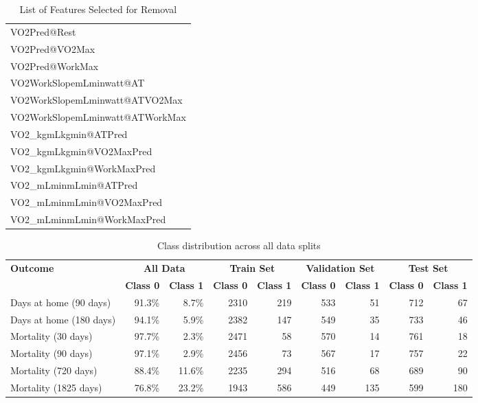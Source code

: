 \documentclass{article}
\begin{document}
\begin{table}[ht]
\begin{tabular}{|l|}
    VO2Pred@Rest \\
    VO2Pred@VO2Max \\
    VO2Pred@WorkMax \\
    VO2WorkSlopemLminwatt@AT \\
    VO2WorkSlopemLminwatt@ATVO2Max \\
    VO2WorkSlopemLminwatt@ATWorkMax \\
    VO2\_kgmLkgmin@ATPred \\
    VO2\_kgmLkgmin@VO2MaxPred \\
    VO2\_kgmLkgmin@WorkMaxPred \\
    VO2\_mLminmLmin@ATPred \\
    VO2\_mLminmLmin@VO2MaxPred \\
    VO2\_mLminmLmin@WorkMaxPred \\
    \hline
    \end{tabular}
    \caption{List of Features Selected for Removal}
    \label{tab:features-to-remove}
\end{table}

\begin{table}[H]
    \centering
    \begin{tabular}{l|rr|rr|rr|rr}
    \toprule
    \multirow{2}{*}{\textbf{Outcome}} & \multicolumn{2}{c|}{\textbf{All Data}} & \multicolumn{2}{c|}{\textbf{Train Set}} & \multicolumn{2}{c|}{\textbf{Validation Set}} & \multicolumn{2}{c}{\textbf{Test Set}} \\
    \cmidrule(lr){2-3} \cmidrule(lr){4-5} \cmidrule(lr){6-7} \cmidrule(lr){8-9}
    & \textbf{Class 0} & \textbf{Class 1} & \textbf{Class 0} & \textbf{Class 1} & \textbf{Class 0} & \textbf{Class 1} & \textbf{Class 0} & \textbf{Class 1} \\
    \midrule
    Days at home (90 days) & 91.3\% & 8.7\% & 2310 & 219 & 533 & 51 & 712 & 67 \\
    Days at home (180 days) & 94.1\% & 5.9\% & 2382 & 147 & 549 & 35 & 733 & 46 \\
    Mortality (30 days) & 97.7\% & 2.3\% & 2471 & 58 & 570 & 14 & 761 & 18 \\
    Mortality (90 days) & 97.1\% & 2.9\% & 2456 & 73 & 567 & 17 & 757 & 22 \\
    Mortality (720 days) & 88.4\% & 11.6\% & 2235 & 294 & 516 & 68 & 689 & 90 \\
    Mortality (1825 days) & 76.8\% & 23.2\% & 1943 & 586 & 449 & 135 & 599 & 180 \\
    \bottomrule
    \end{tabular}
    \caption{Class distribution across all data splits}
    \label{tab:class-distribution}
\end{table}
\end{document}
